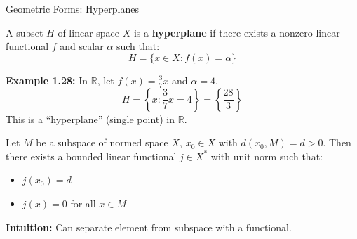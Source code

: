 \documentclass[aspectratio=169,10pt]{beamer}
\begin{document}
\begin{frame}{Geometric Forms: Hyperplanes}
  \begin{definition}[Hyperplane]
    A subset $H$ of linear space $X$ is a \textbf{hyperplane} if there exists a nonzero linear functional $f$ and scalar $\alpha$ such that:
    $$H = \{x \in X : f(x) = \alpha\}$$
  \end{definition}

  \vspace{0.3cm}
  \textbf{Example 1.28:} In $\mathbb{R}$, let $f(x) = \frac{3}{7}x$ and $\alpha = 4$.
  $$H = \left\{x : \frac{3}{7}x = 4\right\} = \left\{\frac{28}{3}\right\}$$
  This is a ``hyperplane'' (single point) in $\mathbb{R}$.

  \vspace{0.3cm}
  \begin{theorem}
    Let $M$ be a subspace of normed space $X$, $x_0 \in X$ with $d(x_0, M) = d > 0$. Then there exists a bounded linear functional $j \in X^*$ with unit norm such that:
    \begin{itemize}
      \item $j(x_0) = d$
      \item $j(x) = 0$ for all $x \in M$
    \end{itemize}
  \end{theorem}

  \vspace{0.2cm}
  \textbf{Intuition:} Can separate element from subspace with a functional.
\end{frame}
\end{document}
